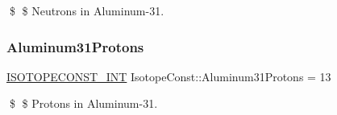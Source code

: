 \$ \$ Neutrons in Aluminum-\/31. \mbox{\label{group___isotope_const-_aluminum-_al31_ga1ed0e505b7250fbfa53df87f36fa4ebe}} 
\subsubsection{\texorpdfstring{Aluminum31\+Protons}{Aluminum31Protons}}
{\footnotesize\ttfamily \mbox{\hyperlink{group___isotope_const-_macros_ga5f18360b3e99483a35c32d789e62621c}{I\+S\+O\+T\+O\+P\+E\+C\+O\+N\+S\+T\+\_\+\+I\+NT}} Isotope\+Const\+::\+Aluminum31\+Protons = 13}

\$ \$ Protons in Aluminum-\/31. 